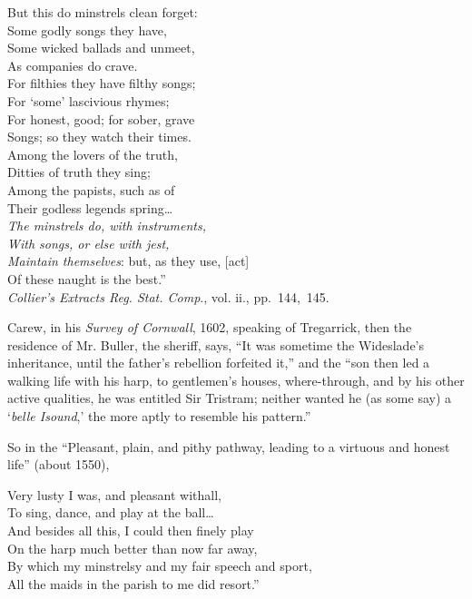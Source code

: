 \settowidth{\versewidth}{But this do minstrels clean forget:}
\begin{scverse}
\begin{altverse}
But this do minstrels clean forget:\\
Some godly songs they have,\\
Some wicked ballads and unmeet,\\
As companies do crave.\\
For filthies they have filthy songs;\\
For ‘some’ lascivious rhymes;\\
For honest, good; for sober, grave\\
Songs; so they watch their times.\\
Among the lovers of the truth,\\
Ditties of truth they sing;\\
Among the papists, such as of\\
Their godless legends spring\ldots\\
\textit{The minstrels do, with instruments,\\
With songs, or else with jest,\\
Maintain themselves}: but, as they use, [act]\\
Of these naught is the best.”\\
\vin\textit{Collier’s Extracts Reg. Stat. Comp}., vol. ii., pp.~144,~145.
\end{altverse}
\end{scverse}


Carew, in his \textit{Survey of Cornwall}, 1602, \pagebreak speaking of Tregarrick, then the
 residence of Mr. Buller, the sheriff, says, “It was sometime the Wideslade’s
inheritance, until the father’s rebellion forfeited it,” and the “son then led
a walking life with his harp, to gentlemen’s houses, where-through, and by his
other active qualities, he was entitled Sir Tristram; neither wanted he (as some
say) a ‘\textit{belle Isound},’ the more aptly to resemble his pattern.”

So in the “Pleasant, plain, and pithy pathway, leading to a virtuous and honest
life” (about 1550),

\settowidth{\versewidth}{By which my minstrelsy and my fair speech and sport,}
\begin{scverse}Very lusty I was, and pleasant withall,\\
To sing, dance, and play at the ball\ldots \\
And besides all this, I could then finely play\\
On the harp much better than now far away,\\
By which my minstrelsy and my fair speech and sport,\\
All the maids in the parish to me did resort.”
\end{scverse}

